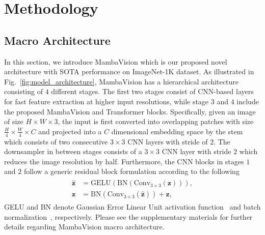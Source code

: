 \documentclass[10pt,twocolumn,letterpaper]{article}
\begin{document}
\section{Methodology}
\label{sec:method}
\subsection{Macro Architecture}
In this section, we introduce MambaVision which is our proposed novel architecture with SOTA performance on ImageNet-1K dataset. As illustrated in Fig.~\ref{fig:model_architecture}, MambaVision has a hierarchical architecture consisting of $4$ different stages. The first two stages consist of CNN-based layers for fast feature extraction at higher input resolutions, while stage $3$ and $4$ include the proposed MambaVision and Transformer blocks. Specifically, given an image of size $H \times W \times 3$, the input is first converted into overlapping patches with size $\frac{H}{4} \times \frac{W}{4} \times C$ and projected into a $C$ dimensional embedding space by the stem which consists of two consecutive $3 \times 3$ CNN layers with stride of $2$. The downsampler in between stages consists of a $3 \times 3$ CNN layer with stride $2$ which reduces the image resolution by half. Furthermore, the CNN blocks in stages $1$ and $2$ follow a generic residual block formulation according to the following 
\begin{align}
\begin{split}
\mathbf{\hat{z}} & = \text{GELU}(\text{BN}(\text{Conv}_{3\times3}(\mathbf{z}))), \\
\mathbf{z} & = \text{BN}(\text{Conv}_{3\times3}(\mathbf{\hat{z}})) + \mathbf{z},
\label{eq:fused_convmb}
\end{split}
\end{align}
GELU and BN denote Gaussian Error Linear Unit activation function~\cite{hendrycks2016gaussian} and batch normalization~\cite{ioffe2015batch}, respectively. Please see the supplementary materials for further details regarding MambaVision macro architecture. 
\end{document}
